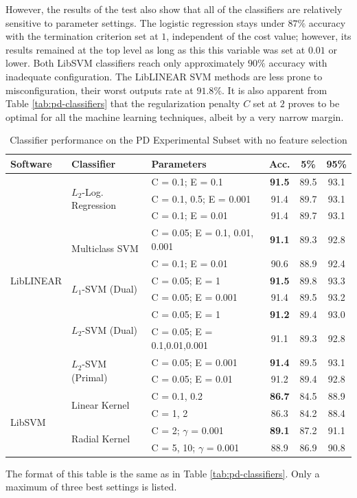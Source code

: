 \documentclass[12pt,notitlepage]{report}
\begin{document}
However, the results of the test also show that all of the classifiers are relatively sensitive to parameter settings. The logistic regression stays under $87\%$ accuracy with the termination criterion set at $1$, independent of the cost value; however, its results remained at the top level as long as this this variable was set at $0.01$ or lower. Both LibSVM classifiers reach only approximately $90\%$ accuracy with inadequate configuration. The LibLINEAR SVM methods are less prone to misconfiguration, their worst outputs rate at $91.8\%$. It is also apparent from Table \ref{tab:pd-classifiers} that the regularization penalty $C$ set at $2$ proves to be optimal for all the machine learning techniques, albeit by a very narrow margin.

\begin{table}[htpb]
\caption{Classifier performance on the PD Experimental Subset with no feature selection}\label{tab:pd-allfeat}\footnotesize
\begin{center}
\shorthandoff{-}
\begin{tabular}{|l|l|l|c|c|c|}\hline
\bf Software & \bf Classifier & \bf Parameters & \bf Acc. & \bf 5\% & \bf 95\% \\\hline
\multirow{11}{*}{LibLINEAR} & \multirow{3}{*}{$L_2$-Log. Regression} & C = 0.1; E = 0.1 & \bf 91.5 & 89.5 & 93.1 \\
 & & C = 0.1, 0.5; E = 0.001 & 91.4 & 89.7 & 93.1 \\
 & & C = 0.1; E = 0.01 & 91.4 & 89.7 & 93.1 \\\cline{2-6}
 & \multirow{2}{*}{Multiclass SVM} & C = 0.05; E = 0.1, 0.01, 0.001 & \bf 91.1 & 89.3 & 92.8 \\ 
 &  & C = 0.1; E = 0.01 & 90.6 & 88.9 & 92.4 \\\cline{2-6}
 & \multirow{2}{*}{$L_1$-SVM (Dual)} & C = 0.05; E = 1 & \bf 91.5 & 89.8 & 93.3 \\
 & & C = 0.05; E = 0.001 & 91.4 & 89.5 & 93.2 \\ \cline{2-6}
 & \multirow{2}{*}{$L_2$-SVM (Dual)} & C = 0.05; E = 1 & \bf 91.2 & 89.4 & 93.0 \\
 &  & C = 0.05; E = 0.1,0.01,0.001 & 91.1 & 89.3 & 92.8 \\\cline{2-6}
 & \multirow{2}{*}{$L_2$-SVM (Primal)} & C = 0.05; E = 0.001 & \bf 91.4 & 89.5 & 93.1 \\
 &  & C = 0.05; E = 0.01 & 91.2 & 89.4 & 92.8  \\\hline
 \multirow{4}{*}{LibSVM} & \multirow{2}{*}{Linear Kernel} & C = 0.1, 0.2 & \bf 86.7 & 84.5 & 88.9  \\
 &  & C = 1, 2 & 86.3 & 84.2 & 88.4 \\\cline{2-6}
 & \multirow{2}{*}{Radial Kernel} & C = 2; $\gamma$ = 0.001 & \bf 89.1 & 87.2 & 91.1 \\
 &  & C = 5, 10; $\gamma$ = 0.001 & 88.9 & 86.9 & 90.8 \\\hline
\end{tabular}
\shorthandon{-}
\end{center}
The format of this table is the same as in Table \ref{tab:pd-classifiers}. Only a maximum of three best settings is listed.
\end{table}
\end{document}
